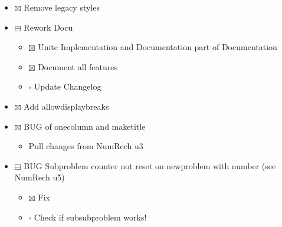 \documentclass[11pt]{article}
\begin{document}
\begin{itemize}
\item $\boxtimes$ Remove legacy styles
\item $\boxminus$ Rework Docu
\begin{itemize}
\item $\boxtimes$ Unite Implementation and Documentation part of Documentation
\item $\boxtimes$ Document all features
\item $\square$ Update Changelog
\end{itemize}
\item $\boxtimes$ Add allowdisplaybreaks
\item $\boxtimes$ BUG of onecolumn and maketitle
\begin{itemize}
\item Pull changes from NumRech u3
\end{itemize}
\item $\boxminus$ BUG Subproblem counter not reset on newproblem with number
(see NumRech u5)
\begin{itemize}
\item $\boxtimes$ Fix
\item $\square$ Check if subsubproblem works!
\end{itemize}
\end{itemize}
\end{document}
